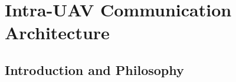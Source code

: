 \newpage
{}
\section{Intra-UAV Communication Architecture} \label{Intra Communication}


\subsection{Introduction and Philosophy}


